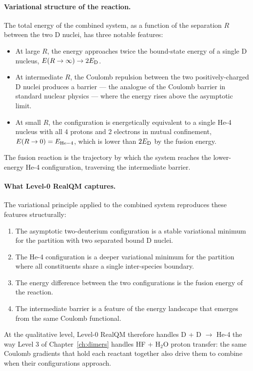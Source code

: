 \paragraph{Variational structure of the reaction.}
The total energy of the combined system, as a function of the separation $R$ between the two D nuclei, has three notable features:
\begin{itemize}
\item At large $R$, the energy approaches twice the bound-state energy of a single D nucleus, $E(R \to \infty) \to 2 E_{\rm D}$.
\item At intermediate $R$, the Coulomb repulsion between the two positively-charged D nuclei produces a barrier --- the analogue of the Coulomb barrier in standard nuclear physics --- where the energy rises above the asymptotic limit.
\item At small $R$, the configuration is energetically equivalent to a single He-4 nucleus with all 4 protons and 2 electrons in mutual confinement, $E(R \to 0) = E_{\rm He-4}$, which is lower than $2 E_{\rm D}$ by the fusion energy.
\end{itemize}
The fusion reaction is the trajectory by which the system reaches the lower-energy He-4 configuration, traversing the intermediate barrier.

\paragraph{What Level-0 RealQM captures.}
The variational principle applied to the combined system reproduces these features structurally:
\begin{enumerate}
\item The asymptotic two-deuterium configuration is a stable variational minimum for the partition with two separated bound D nuclei.
\item The He-4 configuration is a deeper variational minimum for the partition where all constituents share a single inter-species boundary.
\item The energy difference between the two configurations is the fusion energy of the reaction.
\item The intermediate barrier is a feature of the energy landscape that emerges from the same Coulomb functional.
\end{enumerate}
At the qualitative level, Level-0 RealQM therefore handles D + D $\to$ He-4 the way Level 3 of Chapter~\ref{ch:dimers} handles HF + H$_2$O proton transfer: the same Coulomb gradients that hold each reactant together also drive them to combine when their configurations approach.

